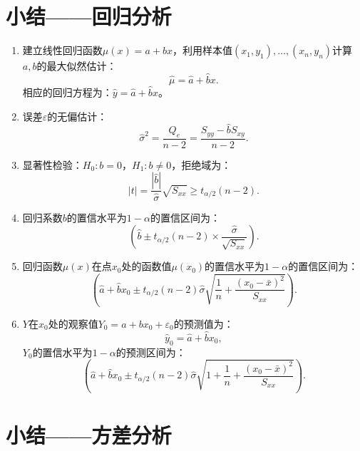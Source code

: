 \documentclass[11pt,a4paper]{report}
\theoremstyle{definition}
\begin{document}
\section*{小结——回归分析}

\begin{enumerate}[label=\arabic*.,leftmargin=2em]
    \item 建立线性回归函数$\mu(x)=a+bx$，利用样本值$(x_{1},y_{1}),\ldots,(x_{n},y_{n})$计算$a,b$的最大似然估计：
    \[
    \hat{\mu}=\hat{a}+\hat{b}x.
    \]
    相应的回归方程为：$\hat{y}=\hat{a}+\hat{b}x$。
    
    \item 误差$\varepsilon$的无偏估计：
    \[
    \hat{\sigma}^{2}=\frac{Q_{e}}{n-2}=\frac{S_{yy}-\hat{b}S_{xy}}{n-2}.
    \]
    
    \item 显著性检验：$H_{0}\colon b=0$，$H_{1}\colon b\neq 0$，拒绝域为：
    \[
    |t|=\frac{|\hat{b}|}{\hat{\sigma}}\sqrt{S_{xx}}\geq t_{\alpha/2}(n-2).
    \]
    
    \item 回归系数$b$的置信水平为$1-\alpha$的置信区间为：
    \[
    \left(\hat{b}\pm t_{\alpha/2}(n-2)\times\frac{\hat{\sigma}}{\sqrt{S_{xx}}}\right).
    \]
    
    \item 回归函数$\mu(x)$在点$x_{0}$处的函数值$\mu(x_{0})$的置信水平为$1-\alpha$的置信区间为：
    \[
    \left(\hat{a}+\hat{b}x_{0}\pm t_{\alpha/2}(n-2)\hat{\sigma}\sqrt{\frac{1}{n}+\frac{(x_{0}-\bar{x})^{2}}{S_{xx}}}\right).
    \]
    
    \item $Y$在$x_{0}$处的观察值$Y_{0}=a+bx_{0}+\varepsilon_{0}$的预测值为：
    \[
    \hat{y}_{0}=\hat{a}+\hat{b}x_{0},
    \]
    $Y_{0}$的置信水平为$1-\alpha$的预测区间为：
    \[
    \left(\hat{a}+\hat{b}x_{0}\pm t_{\alpha/2}(n-2)\hat{\sigma}\sqrt{1+\frac{1}{n}+\frac{(x_{0}-\bar{x})^{2}}{S_{xx}}}\right).
    \]
\end{enumerate}

\section*{小结——方差分析}
\end{document}

